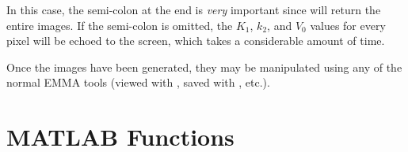 In this case, the semi-colon at the end is {\em very} important since
 will return the entire images.  If the semi-colon is
omitted, the $K_1$, $k_2$, and $V_0$ values for every pixel will be
echoed to the screen, which takes a considerable amount of time.

Once the images have been generated, they may be manipulated using
any of the normal EMMA tools (viewed with , saved
with , etc.).


\newpage
\section{MATLAB Functions}










